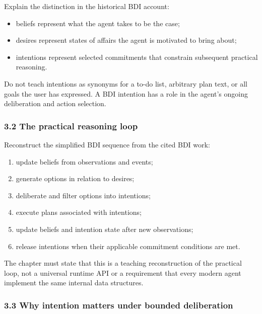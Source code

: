 Explain the distinction in the historical BDI account:

\begin{itemize}
\tightlist
\item
  beliefs represent what the agent takes to be the case;
\item
  desires represent states of affairs the agent is motivated to bring about;
\item
  intentions represent selected commitments that constrain subsequent practical reasoning.
\end{itemize}

Do not teach intentions as synonyms for a to-do list, arbitrary plan text, or all goals the user has expressed. A BDI intention has a role in the agent's ongoing deliberation and action selection.

\subsubsection{3.2 The practical reasoning loop}\label{the-practical-reasoning-loop}

Reconstruct the simplified BDI sequence from the cited BDI work:

\begin{enumerate}
\def\labelenumi{\arabic{enumi}.}
\tightlist
\item
  update beliefs from observations and events;
\item
  generate options in relation to desires;
\item
  deliberate and filter options into intentions;
\item
  execute plans associated with intentions;
\item
  update beliefs and intention state after new observations;
\item
  release intentions when their applicable commitment conditions are met.
\end{enumerate}

The chapter must state that this is a teaching reconstruction of the practical loop, not a universal runtime API or a requirement that every modern agent implement the same internal data structures.

\subsubsection{3.3 Why intention matters under bounded deliberation}\label{why-intention-matters-under-bounded-deliberation}

